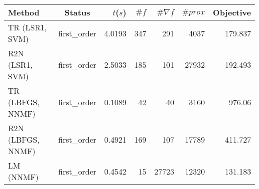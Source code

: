 \begin{tabular}{lcrrrrr}
  \hline
  \textbf{Method} & \textbf{Status} & \textbf{$t$($s$)} & \textbf{$\#f$} & \textbf{$\#\nabla f$} & \textbf{$\#prox$} & \textbf{Objective} \\\hline
  TR (LSR1, SVM) & first\_order & 4.0193 & 347 & 291 & 4037 & 179.837 \\
  R2N (LSR1, SVM) & first\_order & 2.5033 & 185 & 101 & 27932 & 192.493 \\
  TR (LBFGS, NNMF) & first\_order & 0.1089 & 42 & 40 & 3160 & 976.06 \\
  R2N (LBFGS, NNMF) & first\_order & 0.4921 & 169 & 107 & 17789 & 411.727 \\
  LM (NNMF) & first\_order & 0.4542 & 15 & 27723 & 12320 & 131.183 \\\hline
\end{tabular}
